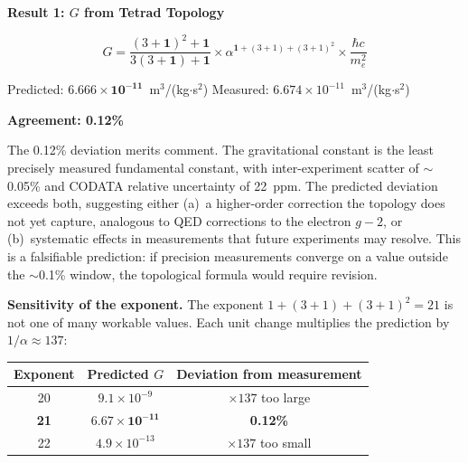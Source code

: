 \documentclass[aps,prd,preprint,superscriptaddress,showpacs,preprintnumbers,amsmath,amssymb,nofootinbib]{revtex4-2}
\begin{document}
\vspace{1.5em}
\noindent
\colorbox{resultgreen}{\parbox{\dimexpr\textwidth-2\fboxsep\relax}{%
\vspace{0.8em}
\centering
\textbf{\large Result 1: $G$ from Tetrad Topology}

\vspace{0.5em}
\boldmath
\begin{equation}
G = \frac{(3+\mathbf{1})^2 + \mathbf{1}}{3(3+\mathbf{1}) + \mathbf{1}} \times \alpha^{\mathbf{1}+(3+1)+(3+1)^2} \times \frac{\hbar c}{m_e^2}
\label{eq:master}
\end{equation}
\unboldmath

\vspace{0.3em}
Predicted: $\bm{6.666 \times 10^{-11}}$~m$^3$/(kg$\cdot$s$^2$) \quad Measured: $6.674 \times 10^{-11}$~m$^3$/(kg$\cdot$s$^2$)

\textbf{Agreement: 0.12\%}
\vspace{0.5em}
}}
\vspace{1cm}

The 0.12\% deviation merits comment. The gravitational constant is the least precisely measured fundamental constant, with inter-experiment scatter of $\sim$0.05\% and CODATA relative uncertainty of 22~ppm. The predicted deviation exceeds both, suggesting either (a)~a higher-order correction the topology does not yet capture, analogous to QED corrections to the electron $g-2$, or (b)~systematic effects in measurements that future experiments may resolve. This is a falsifiable prediction: if precision measurements converge on a value outside the $\sim$0.1\% window, the topological formula would require revision.

\textbf{Sensitivity of the exponent.} The exponent $1 + (3+1) + (3+1)^2 = 21$ is not one of many workable values. Each unit change multiplies the prediction by $1/\alpha \approx 137$:

\begin{center}
\begin{tabular}{ccc}
\toprule
\textbf{Exponent} & \textbf{Predicted $G$} & \textbf{Deviation from measurement} \\
\midrule
20 & $9.1 \times 10^{-9}$ & $\times 137$ too large \\
\textbf{21} & $\bm{6.67 \times 10^{-11}}$ & \textbf{0.12\%} \\
22 & $4.9 \times 10^{-13}$ & $\times 137$ too small \\
\bottomrule
\end{tabular}
\end{center}
\end{document}
